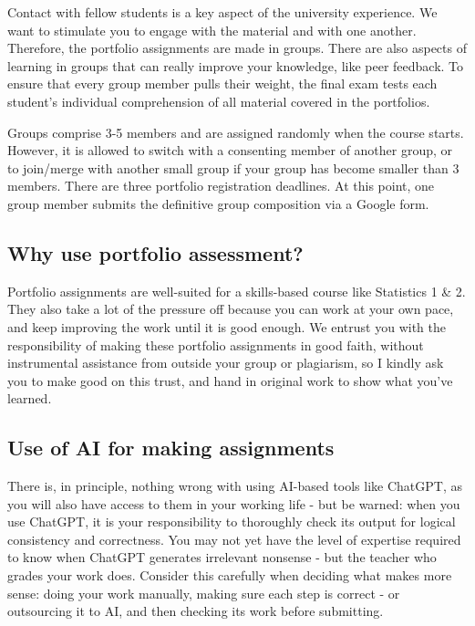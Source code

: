 \documentclass[
  letterpaper,
]{scrbook}
\begin{document}
Contact with fellow students is a key aspect of the university
experience. We want to stimulate you to engage with the material and
with one another. Therefore, the portfolio assignments are made in
groups. There are also aspects of learning in groups that can really
improve your knowledge, like peer feedback. To ensure that every group
member pulls their weight, the final exam tests each student's
individual comprehension of all material covered in the portfolios.

Groups comprise 3-5 members and are assigned randomly when the course
starts. However, it is allowed to switch with a consenting member of
another group, or to join/merge with another small group if your group
has become smaller than 3 members. There are three portfolio
registration deadlines. At this point, one group member submits the
definitive group composition via a Google form.

\hypertarget{why-use-portfolio-assessment}{%
\subsection*{Why use portfolio
assessment?}\label{why-use-portfolio-assessment}}

Portfolio assignments are well-suited for a skills-based course like
Statistics 1 \& 2. They also take a lot of the pressure off because you
can work at your own pace, and keep improving the work until it is good
enough. We entrust you with the responsibility of making these portfolio
assignments in good faith, without instrumental assistance from outside
your group or plagiarism, so I kindly ask you to make good on this
trust, and hand in original work to show what you've learned.

\hypertarget{use-of-ai-for-making-assignments}{%
\subsection*{Use of AI for making
assignments}\label{use-of-ai-for-making-assignments}}

There is, in principle, nothing wrong with using AI-based tools like
ChatGPT, as you will also have access to them in your working life - but
be warned: when you use ChatGPT, it is your responsibility to thoroughly
check its output for logical consistency and correctness. You may not
yet have the level of expertise required to know when ChatGPT generates
irrelevant nonsense - but the teacher who grades your work does.
Consider this carefully when deciding what makes more sense: doing your
work manually, making sure each step is correct - or outsourcing it to
AI, and then checking its work before submitting.
\end{document}
